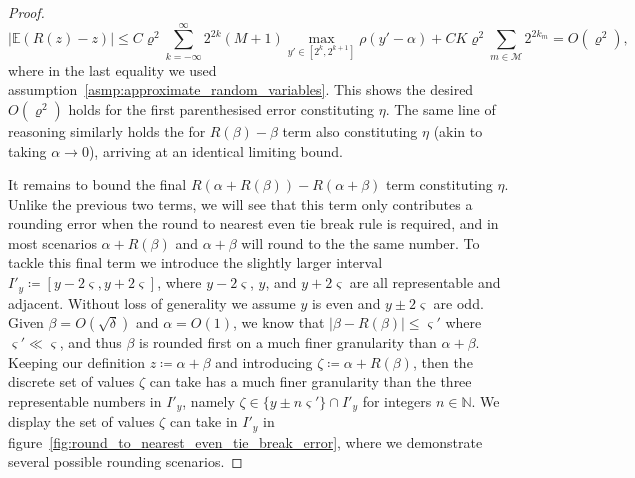 \documentclass[manuscript,review]{acmart}
\begin{document}
\begin{proof}
\begin{equation*}
\lvert \mathbb{E}(R(z) - z) \rvert  \leq C \varrho^2 \sum_{k=-\infty}^{\infty}   2^{2k} (M+1) \max_{y'\in[2^{k}, 2^{k+1}]} \rho(y' - \alpha) 
+ C K \varrho^2 \sum_{m \in \mathcal{M}} 2^{2k_m} = O(\varrho^2), 
\end{equation*}
where in the last equality we used assumption~\ref{asmp:approximate_random_variables}. This shows the desired $ O(\varrho^2) $ holds for the first parenthesised error constituting $ \eta $. The same line of reasoning similarly holds the for $ R(\beta) - \beta $ term also constituting $ \eta $ (akin to taking $ \alpha \to 0 $), arriving at an identical limiting bound.

It remains to bound the final $ R(\alpha + R(\beta)) - R(\alpha + \beta) $ term constituting $ \eta $. Unlike the previous two terms, we will see that this term only contributes a rounding error when the round to nearest even tie break rule is required, and in most scenarios $ \alpha + R(\beta)$ and $\alpha + \beta $ will round to the the same number. To tackle this final term we introduce the slightly larger interval $ I'_y \coloneqq [y-2\varsigma, y+2\varsigma] $, where $ y-2\varsigma $, $ y $, and $ y + 2\varsigma $ are all representable and adjacent. Without loss of generality we assume $ y $ is even and $ y \pm 2\varsigma $ are odd. Given $ \beta = O(\sqrt{\delta}) $ and $ \alpha  = O(1) $, we know that $ \lvert \beta - R(\beta)\rvert \leq \varsigma' $ where $ \varsigma' \ll \varsigma $, and thus $ \beta  $ is rounded first on a much finer granularity than $ \alpha + \beta $. Keeping our definition $ z \coloneqq \alpha + \beta $ and introducing $ \zeta \coloneqq \alpha + R(\beta) $, then the discrete set of values $ \zeta $ can take has a much finer granularity than the three representable numbers in $ I'_y $, namely $ \zeta \in \{y \pm n \varsigma'\} \cap I'_y$ for integers $ n \in \mathbb{N} $. We display the set of values $ \zeta $ can take in $ I'_y $ in figure~\ref{fig:round_to_nearest_even_tie_break_error}, where we demonstrate several possible rounding scenarios. 


\end{proof}
\end{document}
